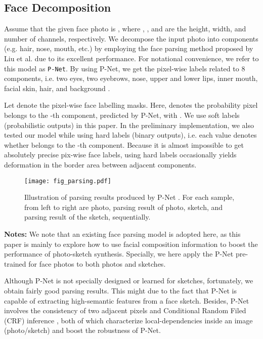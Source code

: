 \documentclass[journal]{IEEEtran}
\begin{document}
\subsection{Face Decomposition}
\label{sec:faceparsing}

Assume that the given face photo is , where , , and  are the height, width, and number of channels, respectively. We decompose the input photo into  components (e.g. hair, nose, mouth, etc.) by employing the face parsing method proposed by Liu et al. \cite{Liu2015Multi} due to its excellent performance. For notational convenience, we refer to this model as \texttt{P-Net}. By using P-Net, we get the pixel-wise labels related to 8 components, i.e. two eyes, two eyebrows, nose, upper and lower lips, inner mouth, facial skin, hair, and background \cite{Liu2015Multi}. 

Let  denote the pixel-wise face labelling masks. Here,  denotes the probability pixel  belongs to the -th component, predicted by P-Net,  with . We use soft labels (probabilistic outputs) in this paper. In the preliminary implementation, we also tested our model while using hard labels (binary outputs), i.e. each value  denotes whether  belongs to the -th component.
Because it is almost impossible to get absolutely precise pix-wise face labels, using hard labels occasionally yields deformation in the border area between adjacent components.



\begin{figure}
\begin{center}
\texttt{[image: fig\_parsing.pdf]}
\end{center}
   \vspace{-0.4cm}
   \caption{Illustration of parsing results produced by P-Net \cite{Liu2015Multi}. For each sample, from left to right are photo, parsing result of photo, sketch, and parsing result of the sketch, sequentially.}
\label{fig:parsing}
   \vspace{-0.4cm}
\end{figure}

\textbf{Notes:} 
We note that an existing face parsing model \cite{Liu2015Multi} is adopted here, as this paper is mainly to explore how to use facial composition information to boost the performance of photo-sketch synthesis. Specially, we here apply the P-Net \cite{Liu2015Multi} pre-trained for face photos to both photos and sketches. 

Although P-Net is not specially designed or learned for sketches, fortunately, we obtain fairly good parsing results. This might due to the fact that P-Net is capable of extracting high-semantic features from a face sketch. Besides, P-Net involves the consistency of two adjacent pixels and Conditional Random Filed (CRF) inference \cite{Liu2015Multi}, both of which characterize local-dependencies inside an image (photo/sketch) and boost the robustness of P-Net.
\end{document}
